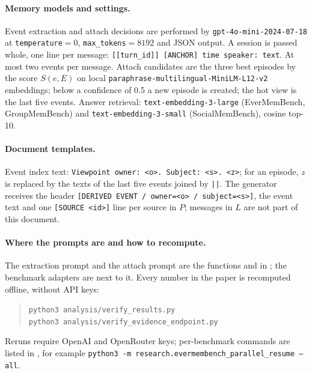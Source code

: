 \documentclass[11pt,a4paper]{article}
\begin{document}
\begin{sloppypar}
\paragraph{Memory models and settings.}
Event extraction and attach decisions are performed by \texttt{gpt-4o-mini-2024-07-18}
at \texttt{temperature}${}=0$, \texttt{max\_tokens}${}=8192$ and JSON output. A session is
passed whole, one line per message: \texttt{[[turn\_id]] [ANCHOR] time speaker: text}.
At most two events per message. Attach candidates are the three best episodes by the
score $S(e,E)$ on local \texttt{paraphrase-multilingual-MiniLM-L12-v2} embeddings; below a
confidence of 0.5 a new episode is created; the hot view is the last five events. Answer
retrieval: \texttt{text-embedding-3-large} (EverMemBench, GroupMemBench) and
\texttt{text-embedding-3-small} (SocialMemBench), cosine top-10.

\paragraph{Document templates.}
Event index text: \texttt{Viewpoint owner: <o>. Subject: <s>. <z>}; for an episode, $z$
is replaced by the texts of the last five events joined by \texttt{||}. The generator
receives the header \texttt{[DERIVED EVENT / owner=<o> / subject=<s>]}, the event text and
one \texttt{[SOURCE <id>]} line per source in $P$; messages in $L$ are not part of this
document.

\paragraph{Where the prompts are and how to recompute.}
The extraction prompt and the attach prompt are the functions
 and  in
; the benchmark adapters are
next to it. Every number in the paper is recomputed offline, without API keys:
\begin{quote}\small
\texttt{python3 analysis/verify\_results.py}\\
\texttt{python3 analysis/verify\_evidence\_endpoint.py}
\end{quote}
Reruns require OpenAI and OpenRouter keys; per-benchmark commands are listed in
, for example
\texttt{python3 -m research.evermembench\_parallel\_resume --all}.
\end{sloppypar}
\end{document}
